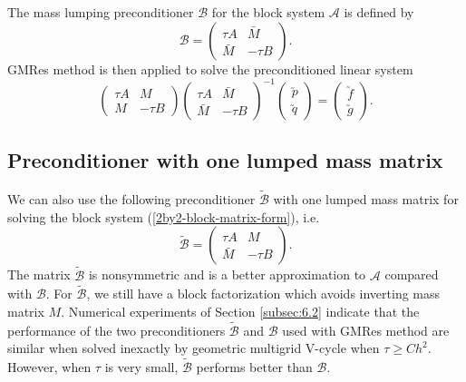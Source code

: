 \documentclass[smallcondensed]{svjour3}
\numberwithin{equation}{section} \numberwithin{table}{section}
\numberwithin{figure}{section}
\numberwithin{algorithm}{section}
\begin{document}
The mass lumping preconditioner $\mathcal{B}$ for the block system $\mathcal{A}$ is defined by
\begin{equation}
\mathcal{B} = \begin{pmatrix}
 \tau A & \bar M\\
 \bar M & -\tau B
\end{pmatrix}.
\label{mass-lumping-preconditioner-block-system}
\end{equation}
GMRes method is then applied to solve the preconditioned linear system
 \begin{equation}
\begin{pmatrix}
\tau A & {M}\\
 {M}& -\tau B 
\end{pmatrix}
\begin{pmatrix}
\tau A & \bar{M}\\
 \bar{M}& -\tau B 
\end{pmatrix}^{-1}
\left(
\begin{array}{c}
\utilde{p}\\
\utilde{q}
\end{array}
\right)=
\left(\begin{array}{c}
\utilde{f}\\
\utilde{g}
\end{array}\right).
\end{equation}\label{B-preconditioner}

\subsection{Preconditioner with one lumped mass matrix}
\label{modified-preconditioner}
We can also use the following preconditioner $\tilde{\mathcal{B}}$ with one lumped mass matrix for solving the block system (\ref{2by2-block-matrix-form}), i.e.
\begin{equation}
\tilde{\mathcal{B}}= \begin{pmatrix}
\tau A & {M}\\
 \bar{M}& -\tau B 
\end{pmatrix}.
\label{modified-mass-lumping-preconditioner-block}
\end{equation}
The matrix $\tilde{\mathcal{B}}$ is nonsymmetric and is a better approximation to $\mathcal{A}$ compared with $\mathcal{B}$. For $\tilde{\mathcal{B}}$, we still have a block factorization which avoids inverting mass matrix $M$.  Numerical experiments of Section \ref{subsec:6.2} indicate that the performance of the two preconditioners $\tilde{\mathcal{B}}$ and $\mathcal{B}$ used with GMRes method are similar when solved inexactly by geometric multigrid V-cycle when $\tau\geq Ch^2$. However, when $\tau$ is very small, $\tilde{\mathcal{B}}$ performs better than $\mathcal{B}$. 
\end{document}
